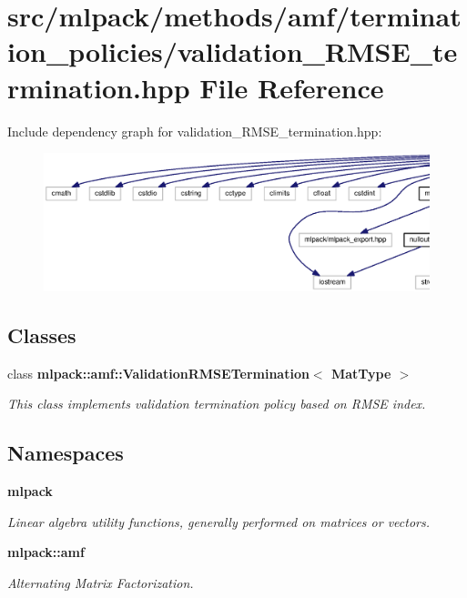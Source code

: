 \section{src/mlpack/methods/amf/termination\+\_\+policies/validation\+\_\+\+R\+M\+S\+E\+\_\+termination.hpp File Reference}
\label{validation__RMSE__termination_8hpp}
Include dependency graph for validation\+\_\+\+R\+M\+S\+E\+\_\+termination.\+hpp\+:
\nopagebreak
\begin{figure}[H]
\begin{center}
\leavevmode
\includegraphics[width=350pt]{validation__RMSE__termination_8hpp__incl}
\end{center}
\end{figure}
\subsection*{Classes}
\begin{DoxyCompactItemize}
\item 
class {\bf mlpack\+::amf\+::\+Validation\+R\+M\+S\+E\+Termination$<$ Mat\+Type $>$}
\begin{DoxyCompactList}\small\item\em This class implements validation termination policy based on R\+M\+SE index. \end{DoxyCompactList}\end{DoxyCompactItemize}
\subsection*{Namespaces}
\begin{DoxyCompactItemize}
\item 
 {\bf mlpack}
\begin{DoxyCompactList}\small\item\em Linear algebra utility functions, generally performed on matrices or vectors. \end{DoxyCompactList}\item 
 {\bf mlpack\+::amf}
\begin{DoxyCompactList}\small\item\em Alternating Matrix Factorization. \end{DoxyCompactList}\end{DoxyCompactItemize}


